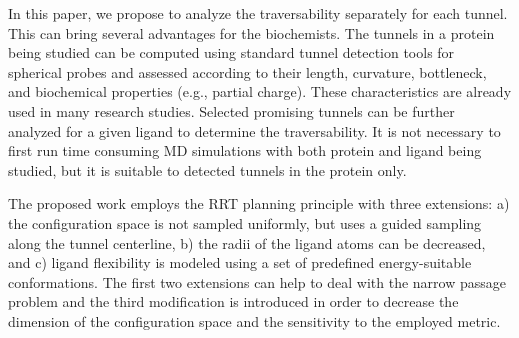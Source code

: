 \documentclass{svmult}
\begin{document}
In this paper, we propose to analyze the traversability separately for each tunnel.
This can bring several advantages for the biochemists.
The tunnels in a protein being studied can be computed using standard tunnel detection tools for spherical probes and assessed
according to their length, curvature, bottleneck, and biochemical properties (e.g., partial charge).
These characteristics are already used in many research studies.
Selected promising tunnels can be further analyzed for a given ligand to determine the traversability.
It is not necessary to first run time consuming MD simulations with both protein and ligand being studied, but it is suitable
to detected tunnels in the protein only.

The proposed work employs the RRT planning principle with three extensions: 
a) the configuration space is not sampled uniformly, but uses a guided sampling along the tunnel centerline,
b) the radii of the ligand atoms can be decreased, and 
c) ligand flexibility is modeled using a set of predefined energy-suitable conformations.
The first two extensions can help to deal with the narrow passage problem and the third modification
is introduced in order to decrease the dimension of the configuration space and the sensitivity to the employed
metric.




%
\end{document}
